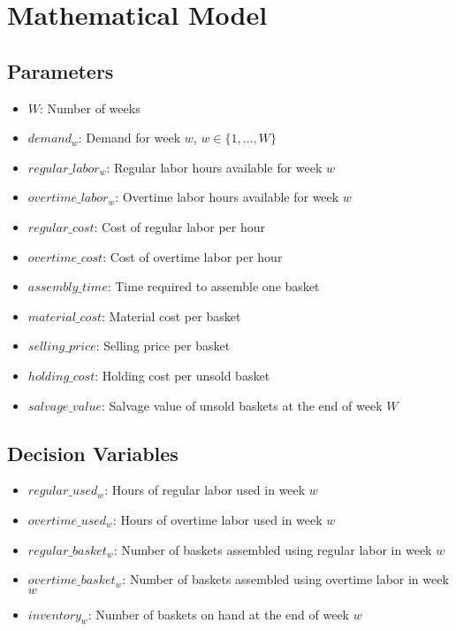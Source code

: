 \documentclass{article}
\begin{document}
\section*{Mathematical Model}

\subsection*{Parameters}
\begin{itemize}
    \item $W$: Number of weeks
    \item $demand_{w}$: Demand for week $w$, $w \in \{1, \ldots, W\}$
    \item $regular\_labor_{w}$: Regular labor hours available for week $w$
    \item $overtime\_labor_{w}$: Overtime labor hours available for week $w$
    \item $regular\_cost$: Cost of regular labor per hour
    \item $overtime\_cost$: Cost of overtime labor per hour
    \item $assembly\_time$: Time required to assemble one basket
    \item $material\_cost$: Material cost per basket
    \item $selling\_price$: Selling price per basket
    \item $holding\_cost$: Holding cost per unsold basket
    \item $salvage\_value$: Salvage value of unsold baskets at the end of week $W$
\end{itemize}

\subsection*{Decision Variables}
\begin{itemize}
    \item $regular\_used_{w}$: Hours of regular labor used in week $w$
    \item $overtime\_used_{w}$: Hours of overtime labor used in week $w$
    \item $regular\_basket_{w}$: Number of baskets assembled using regular labor in week $w$
    \item $overtime\_basket_{w}$: Number of baskets assembled using overtime labor in week $w$
    \item $inventory_{w}$: Number of baskets on hand at the end of week $w$
\end{itemize}
\end{document}
